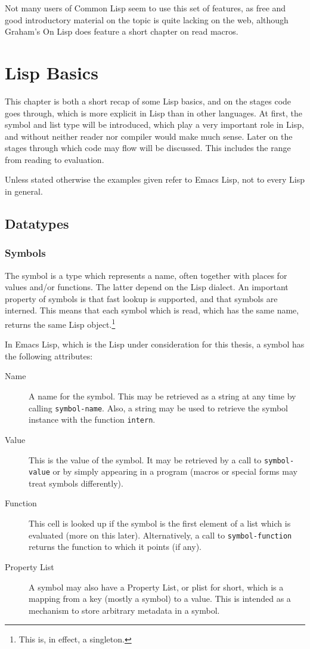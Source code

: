 \documentclass[a4paper,10pt,twoside]{report}
\newcommand{\el}{Emacs Lisp}
\newcommand{\cl}{Common Lisp}
\newcommand{\fun}[1]{\texttt{#1}}
\begin{document}
Not many users of \cl{} seem to use this set of features, as free and good
introductory material on the topic is quite lacking on the web, although
Graham’s On Lisp does feature a short chapter on read macros.\cite[Chapter
17---``Read Macros'']{on-lisp}

\section{Lisp Basics}
\label{section:lisp-basics}

This chapter is both a short recap of some Lisp basics, and on the stages code
goes through, which is more explicit in Lisp than in other languages.  At
first, the symbol and list type will be introduced, which play a very important
role in Lisp, and without neither reader nor compiler would make much sense.
Later on the stages through which code may flow will be discussed.  This
includes the range from reading to evaluation.

Unless stated otherwise the examples given refer to \el{}, not to every Lisp in
general.

\subsection{Datatypes}
\label{subsec:datatypes}

\subsubsection{Symbols}
\label{subsubsec:symbols}

The symbol is a type which represents a name, often together with places for
values and/or functions.  The latter depend on the Lisp dialect.  An important
property of symbols is that fast lookup is supported, and that symbols are
interned.  This means that each symbol which is read, which has the same name,
returns the same Lisp object.\footnote{This is, in effect, a singleton.}

In \el{}, which is the Lisp under consideration for this thesis, a symbol has
the following attributes:

\begin{description}
\item[{Name}] A name for the symbol.  This may be retrieved as a string at any
  time by calling \fun{symbol-name}.  Also, a string may be used to retrieve the
  symbol instance with the function \fun{intern}.
\item[{Value}] This is the value of the symbol.  It may be retrieved by a call
  to \fun{symbol-value} or by simply appearing in a program (macros or special
  forms may treat symbols differently).
\item[{Function}] This cell is looked up if the symbol is the first element of a
  list which is evaluated (more on this later).  Alternatively, a call to
  \fun{symbol-function} returns the function to which it points (if any).
\item[{Property List}] A symbol may also have a Property List, or plist for
  short, which is a mapping from a key (mostly a symbol) to a value.  This is
  intended as a mechanism to store arbitrary metadata in a symbol.
\end{description}
\end{document}
